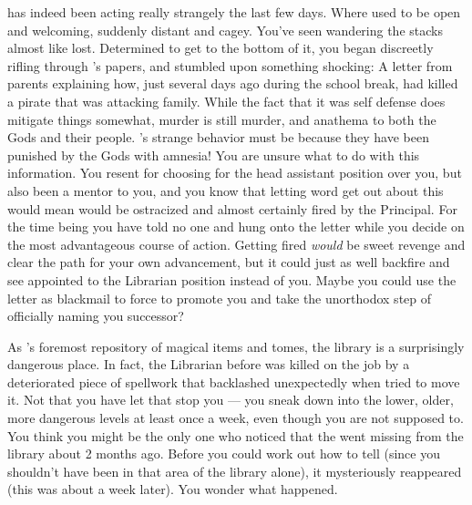 \documentclass[char]{GL2020}
\begin{document}
\cLibrarian{} has indeed been acting really strangely the last few days. Where \cLibrarian{\they} used to be open and welcoming, \cLibrarian{\theyare} suddenly distant and cagey. You've seen \cLibrarian{\them} wandering the stacks almost like \cLibrarian{\theywere} lost. Determined to get to the bottom of it, you began discreetly rifling through \cLibrarian{}’s papers, and stumbled upon something shocking: A letter from \cLibrarian{\their} parents explaining how, just several days ago during the school break, \cLibrarian{\they} had killed a pirate that was attacking \cLibrarian{\their} family. While the fact that it was self defense does mitigate things somewhat, murder is still murder, and anathema to both the Gods and their people. \cLibrarian{}’s strange behavior must be because they have been punished by the Gods with amnesia! You are unsure what to do with this information. You resent \cLibrarian{} for choosing \cAmbition{} for the head assistant position over you, but \cLibrarian{\theyhave} also been a mentor to you, and you know that letting word get out about this would mean \cLibrarian{\they} would be ostracized and almost certainly fired by the Principal. For the time being you have told no one and hung onto the letter while you decide on the most advantageous course of action. Getting \cLibrarian{} fired \emph{would} be sweet revenge and clear the path for your own advancement, but it could just as well backfire and see \cAmbition{} appointed to the Librarian position instead of you. Maybe you could use the letter as blackmail to force \cLibrarian{} to promote you and take the unorthodox step of officially naming you \cLibrarian{\their} successor?

As \pEarth{}'s foremost repository of magical items and tomes, the library is a surprisingly dangerous place. In fact, the Librarian before \cLibrarian{} was killed on the job by a deteriorated piece of spellwork that backlashed unexpectedly when \cLibrarian{\they} tried to move it. Not that you have let that stop you — you sneak down into the lower, older, more dangerous levels at least once a week, even though you are not supposed to. You think you might be the only one who noticed that the \iScythe{} went missing from the library about 2 months ago. Before you could work out how to tell \cLibrarian{} (since you shouldn't have been in that area of the library alone), it mysteriously reappeared (this was about a week later). You wonder what happened.
\end{document}
